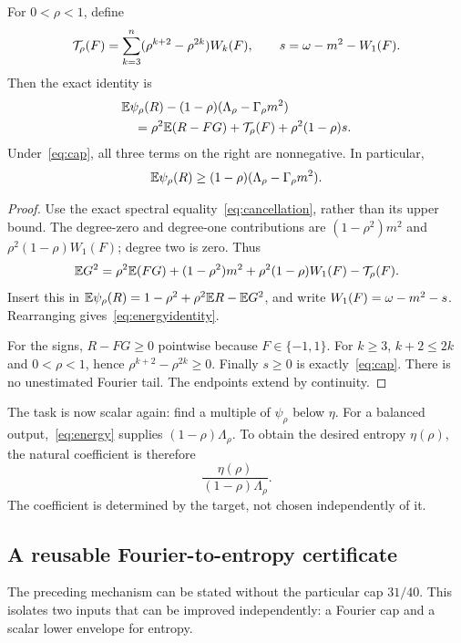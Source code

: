 \begin{lemma}\label{lem:energy}
For $0<\rho<1$, define
\[
\mathcal T_\rho(F)=\sum_{k=3}^n(\rho^{k+2}-\rho^{2k})W_k(F),\qquad
s=\omega-m^2-W_1(F).
\]
Then the exact identity is
\begin{align}\label{eq:energyidentity}
&\mathbb E\psi_\rho(R)-(1-\rho)(\Lambda_\rho-\Gamma_\rho m^2)\notag\\
&\hspace{1em}=\rho^2\mathbb E(R-FG)+\mathcal T_\rho(F)+\rho^2(1-\rho)s.
\end{align}
Under~\eqref{eq:cap}, all three terms on the right are nonnegative. In particular,
\begin{equation}\label{eq:energy}
\mathbb E\psi_\rho(R)\ge(1-\rho)(\Lambda_\rho-\Gamma_\rho m^2).
\end{equation}
\end{lemma}
\begin{proof}
Use the exact spectral equality~\eqref{eq:cancellation}, rather than its upper bound. The degree-zero and degree-one contributions are $(1-\rho^2)m^2$ and $\rho^2(1-\rho)W_1(F)$; degree two is zero. Thus
\[
\mathbb E G^2=\rho^2\mathbb E(FG)+(1-\rho^2)m^2+\rho^2(1-\rho)W_1(F)-\mathcal T_\rho(F).
\]
Insert this in $\mathbb E\psi_\rho(R)=1-\rho^2+\rho^2\mathbb E R-\mathbb E G^2$, and write $W_1(F)=\omega-m^2-s$. Rearranging gives~\eqref{eq:energyidentity}.

For the signs, $R-FG\ge0$ pointwise because $F\in\{-1,1\}$. For $k\ge3$, $k+2\le2k$ and $0<\rho<1$, hence $\rho^{k+2}-\rho^{2k}\ge0$. Finally $s\ge0$ is exactly~\eqref{eq:cap}. There is no unestimated Fourier tail. The endpoints extend by continuity.
\end{proof}

The task is now scalar again: find a multiple of $\psi_\rho$ below $\eta$. For a balanced output,~\eqref{eq:energy} supplies $(1-\rho)\Lambda_\rho$. To obtain the desired entropy $\eta(\rho)$, the natural coefficient is therefore
\[
\frac{\eta(\rho)}{(1-\rho)\Lambda_\rho}.
\]
The coefficient is determined by the target, not chosen independently of it.

\subsection{A reusable Fourier-to-entropy certificate}\label{sec:certificate}
The preceding mechanism can be stated without the particular cap $31/40$. This isolates two inputs that can be improved independently: a Fourier cap and a scalar lower envelope for entropy.

